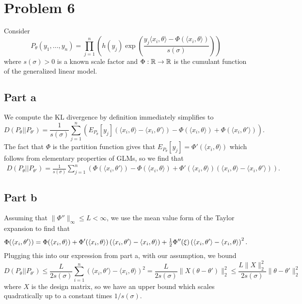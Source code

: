\documentclass{article}
\begin{document}
\section{Problem 6}
Consider 
\[
P_\theta(y_1,\ldots,y_n)=\prod_{j=1}^n\left(h(y_j)\exp\left(\frac{y_j\langle x_i,\theta\rangle-\Phi(\langle x_i,\theta\rangle)}{s(\sigma)}\right)\right)
\]
where $s(\sigma)>0$ is a known scale factor and $\Phi:\mathbb{R}\to\mathbb{R}$ is the cumulant function of the generalized linear model. 
\subsection{Part a}
We compute the KL divergence by definition immediately simplifies to
\[
D(P_\theta||P_{\theta'})=\frac{1}{s(\sigma)}\sum_{j=1}^{n}\left(E_{P_\theta}[y_j]\left(\langle x_i,\theta\rangle-\langle x_i,\theta'\rangle\right)-\Phi(\langle x_i,\theta\rangle)+\Phi(\langle x_i,\theta'\rangle)\right).
\]
The fact that $\Phi$ is the partition function gives that $E_{P_\theta}[y_j]=\Phi'(\langle x_i,\theta\rangle)$ which follows from elementary properties of GLMs, so we find that
\begin{align*}
D(P_\theta||P_{\theta'})=\frac{1}{s(\sigma)}\sum_{j=1}^{n}\left(\Phi(\langle x_i,\theta'\rangle)-\Phi(\langle x_i,\theta\rangle)+\Phi'(\langle x_i,\theta\rangle)\left(\langle x_i,\theta\rangle-\langle x_i,\theta'\rangle\right)\right).
\end{align*}
\subsection{Part b}
Assuming that $\|\Phi''\|_\infty\leq L<\infty$, we use the mean value form of the Taylor expansion to find that 
\begin{align*}
\Phi(\langle x_i,\theta'\rangle)=\Phi(\langle x_i,\theta\rangle)+\Phi'(\langle x_i,\theta\rangle)\left(\langle x_i,\theta'\rangle-\langle x_i,\theta\rangle\right)+\mbox{$\frac{1}{2}$}\Phi''(\xi)\left(\langle x_i,\theta'\rangle-\langle x_i,\theta\rangle\right)^2.
\end{align*}
Plugging this into our expression from part a, with our assumption, we bound
\[
D(P_\theta||P_{\theta'})\leq\frac{L}{2s(\sigma)}\sum_{i=1}^{n}\left(\langle x_i,\theta'\rangle-\langle x_i,\theta\rangle\right)^2=\frac{L}{2s(\sigma)}\|X(\theta-\theta')\|_2^2\leq\frac{L\|X\|_2^2}{2s(\sigma)}\|\theta-\theta'\|_2^2
\]
where $X$ is the design matrix, so we have an upper bound which scales quadratically up to a constant times $1/s(\sigma)$. 
\end{document}
